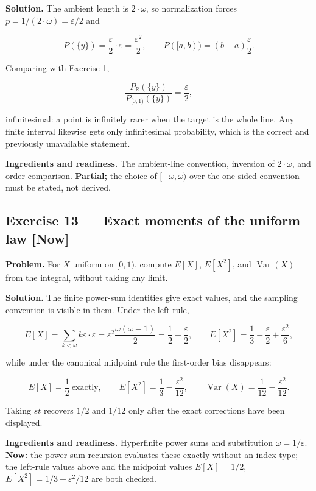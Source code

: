 \documentclass[11pt]{article}
\newcommand{\eps}{\varepsilon}
\renewcommand{\epsilon}{\varepsilon}
\newcommand{\Var}{\operatorname{Var}}
\begin{document}
\textbf{Solution.} The ambient length is $2\cdot \omega$, so normalization forces
$p = 1/(2\cdot \omega) = \eps/2$ and

\[
P(\{y\})=\frac\epsilon2\cdot\epsilon=\frac{\epsilon^{2}}2,
\qquad
P([a,b))=(b-a)\frac\epsilon2 .
\]

Comparing with Exercise 1,

\[
\frac{P_{\mathbb R}(\{y\})}{P_{[0,1)}(\{y\})}=\frac\epsilon2 ,
\]

infinitesimal: a point is infinitely rarer when the target is the whole line.
Any finite interval likewise gets only infinitesimal probability, which is the
correct and previously unavailable statement.

\textbf{Ingredients and readiness.} The ambient-line convention, inversion of
$2\cdot \omega$, and order comparison. \textbf{Partial;} the choice of $[-\omega, \omega)$
over the one-sided convention must be stated, not derived.


\subsection*{Exercise 13 --- Exact moments of the uniform law \hfill \normalfont\small[Now]}

\textbf{Problem.} For $X$ uniform on $[0,1)$, compute $E[X]$, $E[X^2]$, and
$\Var(X)$ from the integral, without taking any limit.

\textbf{Solution.} The finite power-sum identities give exact values, and the
sampling convention is visible in them. Under the left rule,

\[
E[X]=\sum_{k<\omega}k\epsilon\cdot\epsilon
=\epsilon^{2}\frac{\omega(\omega-1)}2=\frac12-\frac\epsilon2,
\qquad
E[X^{2}]=\frac13-\frac\epsilon2+\frac{\epsilon^{2}}6 ,
\]

while under the canonical midpoint rule the first-order bias disappears:

\[
E[X]=\frac12 \ \text{exactly},
\qquad
E[X^{2}]=\frac13-\frac{\epsilon^{2}}{12},
\qquad
\operatorname{Var}(X)=\frac1{12}-\frac{\epsilon^{2}}{12}.
\]

Taking $st$ recovers $1/2$ and $1/12$ only after the exact corrections have
been displayed.

\textbf{Ingredients and readiness.} Hyperfinite power sums and substitution
$\omega = 1/\eps$. \textbf{Now:} the power-sum recursion evaluates these exactly
without an index type; the left-rule values above and the midpoint values
$E[X] = 1/2$, $E[X^2] = 1/3 - \eps^2/12$ are both checked.
\end{document}
